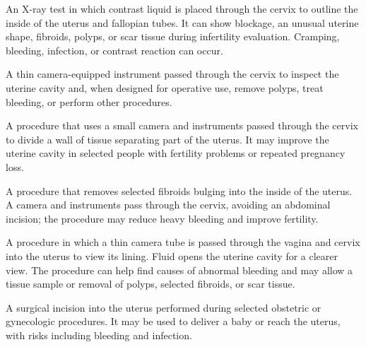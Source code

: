  An X-ray test in which contrast liquid is placed through the cervix to outline the inside of the uterus and fallopian tubes. It can show blockage, an unusual uterine shape, fibroids, polyps, or scar tissue during infertility evaluation. Cramping, bleeding, infection, or contrast reaction can occur.

 A thin camera-equipped instrument passed through the cervix to inspect the uterine cavity and, when designed for operative use, remove polyps, treat bleeding, or perform other procedures.

 A procedure that uses a small camera and instruments passed through the cervix to divide a wall of tissue separating part of the uterus. It may improve the uterine cavity in selected people with fertility problems or repeated pregnancy loss.

 A procedure that removes selected fibroids bulging into the inside of the uterus. A camera and instruments pass through the cervix, avoiding an abdominal incision; the procedure may reduce heavy bleeding and improve fertility.

 A procedure in which a thin camera tube is passed through the vagina and cervix into the uterus to view its lining. Fluid opens the uterine cavity for a clearer view. The procedure can help find causes of abnormal bleeding and may allow a tissue sample or removal of polyps, selected fibroids, or scar tissue.

 A surgical incision into the uterus performed during selected obstetric or gynecologic procedures. It may be used to deliver a baby or reach the uterus, with risks including bleeding and infection.
